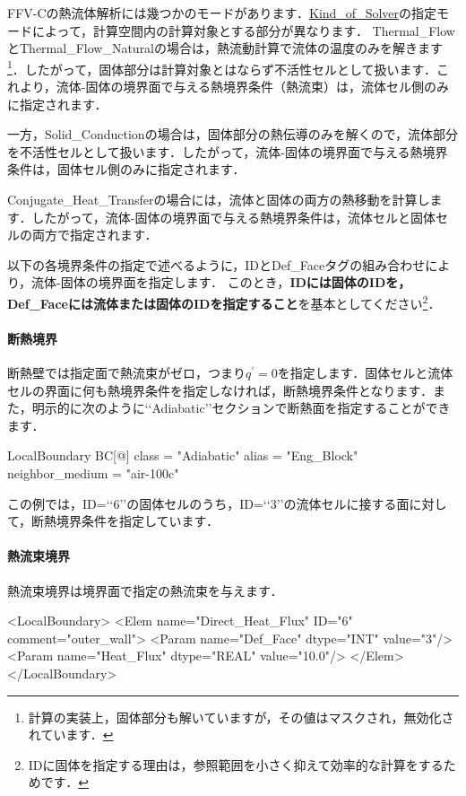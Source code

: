 FFV-Cの熱流体解析には幾つかのモードがあります．\hyperlink{tgt:solver_property}{Kind\_of\_Solver}の指定モードによって，計算空間内の計算対象とする部分が異なります．
Thermal\_FlowとThermal\_Flow\_Naturalの場合は，熱流動計算で流体の温度のみを解きます\footnote{計算の実装上，固体部分も解いていますが，その値はマスクされ，無効化されています．}．したがって，固体部分は計算対象とはならず不活性セルとして扱います．これより，流体-固体の境界面で与える熱境界条件（熱流束）は，流体セル側のみに指定されます．

一方，Solid\_Conductionの場合は，固体部分の熱伝導のみを解くので，流体部分を不活性セルとして扱います．したがって，流体-固体の境界面で与える熱境界条件は，固体セル側のみに指定されます．

Conjugate\_Heat\_Transferの場合には，流体と固体の両方の熱移動を計算します．したがって，流体-固体の境界面で与える熱境界条件は，流体セルと固体セルの両方で指定されます．

以下の各境界条件の指定で述べるように，IDとDef\_Faceタグの組み合わせにより，流体-固体の境界面を指定します．
このとき，\textbf{IDには固体のIDを，Def\_Faceには流体または固体のIDを指定すること}を基本としてください\footnote{IDに固体を指定する理由は，参照範囲を小さく抑えて効率的な計算をするためです．}．

%
\paragraph{断熱境界}
断熱壁では指定面で熱流束がゼロ，つまり$q^{\prime}=0$を指定します．固体セルと流体セルの界面に何も熱境界条件を指定しなければ，断熱境界条件となります．また，明示的に次のように\lq\lq Adiabatic\rq\rq セクションで断熱面を指定することができます．

{\small
\begin{program}
LocalBoundary {
    BC[@] {
      class                    = "Adiabatic"
      alias                    = "Eng_Block"
      neighbor_medium          = "air-100c"
    }
}
\end{program}
}
この例では，ID=\lq\lq 6\rq\rq の固体セルのうち，ID=\lq\lq 3\rq\rq の流体セルに接する面に対して，断熱境界条件を指定しています．

%
\paragraph{熱流束境界}
熱流束境界は境界面で指定の熱流束を与えます．

{\small
\begin{program}
<LocalBoundary>
  <Elem name="Direct_Heat_Flux" ID="6" comment="outer_wall">
    <Param name="Def_Face"    dtype="INT"    value="3"/>
    <Param name="Heat_Flux"   dtype="REAL"   value="10.0"/>
  </Elem>
</LocalBoundary>
\end{program}
}

